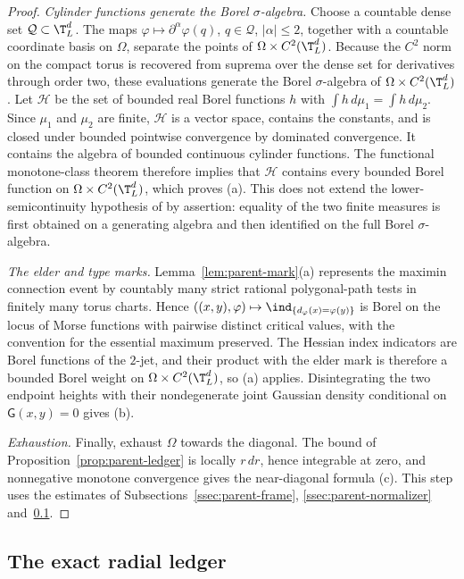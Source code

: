 \begin{proof}
\emph{Cylinder functions generate the Borel $\sigma$-algebra.} Choose a countable dense set $\mathcal Q\subset\T^d_L$. The maps $\varphi\mapsto\partial^\alpha\varphi(q)$, $q\in\mathcal Q$, $|\alpha|\le2$, together with a countable coordinate basis on $\Omega$, separate the points of $\Omega\times C^2(\T^d_L)$. Because the $C^2$ norm on the compact torus is recovered from suprema over the dense set for derivatives through order two, these evaluations generate the Borel $\sigma$-algebra of $\Omega\times C^2(\T^d_L)$. Let $\mathcal H$ be the set of bounded real Borel functions $h$ with $\int h\,d\mu_1=\int h\,d\mu_2$. Since $\mu_1$ and $\mu_2$ are finite, $\mathcal H$ is a vector space, contains the constants, and is closed under bounded pointwise convergence by dominated convergence. It contains the algebra of bounded continuous cylinder functions. The functional monotone-class theorem therefore implies that $\mathcal H$ contains every bounded Borel function on $\Omega\times C^2(\T^d_L)$, which proves (a). This does not extend the lower-semicontinuity hypothesis of \cite[Theorem~7.1]{AAL} by assertion: equality of the two finite measures is first obtained on a generating algebra and then identified on the full Borel $\sigma$-algebra.

\emph{The elder and type marks.} Lemma~\ref{lem:parent-mark}(a) represents the maximin connection event by countably many strict rational polygonal-path tests in finitely many torus charts. Hence $((x,y),\varphi)\mapsto\ind_{\{d_\varphi(x)=\varphi(y)\}}$ is Borel on the locus of Morse functions with pairwise distinct critical values, with the convention for the essential maximum preserved. The Hessian index indicators are Borel functions of the $2$-jet, and their product with the elder mark is therefore a bounded Borel weight on $\Omega\times C^2(\T^d_L)$, so (a) applies. Disintegrating the two endpoint heights with their nondegenerate joint Gaussian density conditional on $\mathsf G(x,y)=0$ gives (b).

\emph{Exhaustion.} Finally, exhaust $\Omega$ towards the diagonal. The bound of Proposition~\ref{prop:parent-ledger} is locally $r\,dr$, hence integrable at zero, and nonnegative monotone convergence gives the near-diagonal formula (c). This step uses the estimates of Subsections~\ref{ssec:parent-frame}, \ref{ssec:parent-normalizer} and~\ref{ssec:parent-ledger}.
\end{proof}

\subsection{The exact radial ledger}\label{ssec:parent-ledger}

